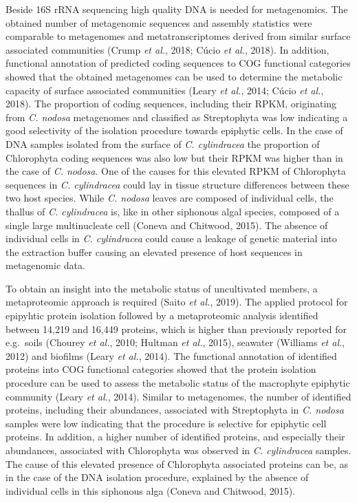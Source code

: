 \documentclass[12pt,]{article}
\begin{document}
Beside 16S rRNA sequencing high quality DNA is needed for metagenomics.
The obtained number of metagenomic sequences and assembly statistics
were comparable to metagenomes and metatranscriptomes derived from
similar surface associated communities (Crump \emph{et al.}, 2018; Cúcio
\emph{et al.}, 2018). In addition, functional annotation of predicted
coding sequences to COG functional categories showed that the obtained
metagenomes can be used to determine the metabolic capacity of surface
associated communities (Leary \emph{et al.}, 2014; Cúcio \emph{et al.},
2018). The proportion of coding sequences, including their RPKM,
originating from \emph{C. nodosa} metagenomes and classified as
Streptophyta was low indicating a good selectivity of the isolation
procedure towards epiphytic cells. In the case of DNA samples isolated
from the surface of \emph{C. cylindracea} the proportion of Chlorophyta
coding sequences was also low but their RPKM was higher than in the case
of \emph{C. nodosa}. One of the causes for this elevated RPKM of
Chlorophyta sequences in \emph{C. cylindracea} could lay in tissue
structure differences between these two host species. While \emph{C.
nodosa} leaves are composed of individual cells, the thallus of \emph{C.
cylindracea} is, like in other siphonous algal species, composed of a
single large multinucleate cell (Coneva and Chitwood, 2015). The absence
of individual cells in \emph{C. cylindracea} could cause a leakage of
genetic material into the extraction buffer causing an elevated presence
of host sequences in metagenomic data.

To obtain an insight into the metabolic status of uncultivated members,
a metaproteomic approach is required (Saito \emph{et al.}, 2019). The
applied protocol for epipyhtic protein isolation followed by a
metaproteomic analysis identified between 14,219 and 16,449 proteins,
which is higher than previously reported for e.g.~soils (Chourey
\emph{et al.}, 2010; Hultman \emph{et al.}, 2015), seawater (Williams
\emph{et al.}, 2012) and biofilms (Leary \emph{et al.}, 2014). The
functional annotation of identified proteins into COG functional
categories showed that the protein isolation procedure can be used to
assess the metabolic status of the macrophyte epiphytic community (Leary
\emph{et al.}, 2014). Similar to metagenomes, the number of identified
proteins, including their abundances, associated with Streptophyta in
\emph{C. nodosa} samples were low indicating that the procedure is
selective for epiphytic cell proteins. In addition, a higher number of
identified proteins, and especially their abundances, associated with
Chlorophyta was observed in \emph{C. cylindracea} samples. The cause of
this elevated presence of Chlorophyta associated proteins can be, as in
the case of the DNA isolation procedure, explained by the absence of
individual cells in this siphonous alga (Coneva and Chitwood, 2015).
\end{document}
